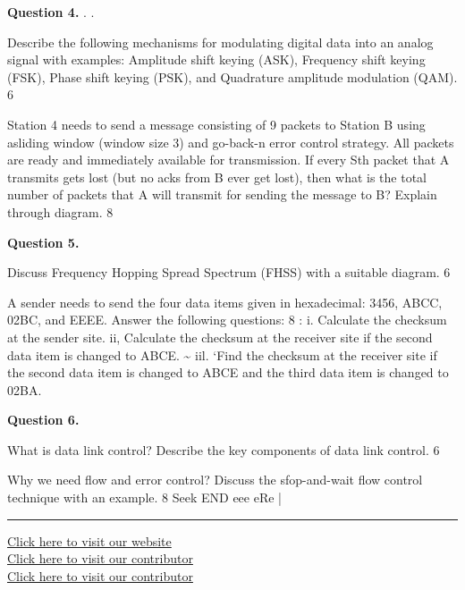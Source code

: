 \documentclass[11pt,a4paper]{article}
\begin{document}
\medskip\noindent\textbf{Question 4.} . .
\begin{parts}
  \item Describe the following mechanisms for modulating digital data into an analog signal with examples:
  Amplitude shift keying (ASK), Frequency shift keying (FSK), Phase shift keying (PSK), and
  Quadrature amplitude modulation (QAM). 6
  \item Station 4 needs to send a message consisting of 9 packets to Station B using asliding window
  (window size 3) and go-back-n error control strategy. All packets are ready and immediately
  available for transmission. If every Sth packet that A transmits gets lost (but no acks from B ever get
  lost), then what is the total number of packets that A will transmit for sending the message to B?
  Explain through diagram. 8
\end{parts}

\medskip\noindent\textbf{Question 5.}
\begin{parts}
  \item Discuss Frequency Hopping Spread Spectrum (FHSS) with a suitable diagram. 6
  \item A sender needs to send the four data items given in hexadecimal: 3456, ABCC, 02BC, and EEEE.
  Answer the following questions: 8
  : i. Calculate the checksum at the sender site.
  ii, Calculate the checksum at the receiver site if the second data item is changed to ABCE.
  \textasciitilde{} iil. ‘Find the checksum at the receiver site if the second data item is changed to ABCE and the
  third data item is changed to 02BA.
\end{parts}

\medskip\noindent\textbf{Question 6.}
\begin{parts}
  \item What is data link control? Describe the key components of data link control. 6
  \item Why we need flow and error control? Discuss the sfop-and-wait flow control technique with an
  example. 8
  Seek END eee eRe |
\end{parts}

\vfill
\rule{\linewidth}{0.4pt}
\begin{center}\small
\href{https://bhu-exam.vercel.app/}{Click here to visit our website}\\[4pt]\href{https://me-aryan.vercel.app/}{Click here to visit our contributor}\\[4pt]\href{https://quashan-me.vercel.app/}{Click here to visit our contributor}
\end{center}
\end{document}

